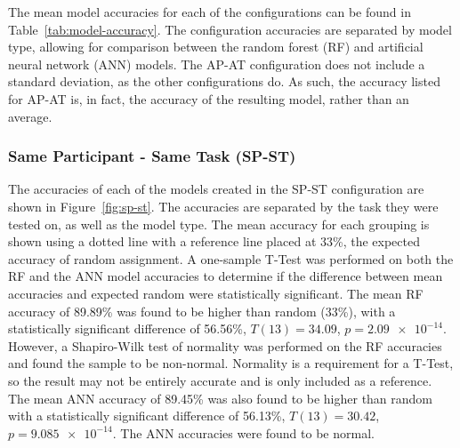 \documentclass[11pt]{article}
\begin{document}
	\begin{table}[]
		\caption[Model Accuracies]{Mean Model Accuracy of Random Forest(RF) and Neural Network(ANN)}
		\centering
		\label{tab:model-accuracy}
	\end{table}

	
	The mean model accuracies for each of the configurations can be found in Table~\ref{tab:model-accuracy}. The configuration accuracies are separated by model type, allowing for comparison between the random forest (RF) and artificial neural network (ANN) models. The AP-AT configuration does not include a standard deviation, as the other configurations do. As such, the accuracy listed for AP-AT is, in fact, the accuracy of the resulting model, rather than an average.
	
		\subsubsection{Same Participant - Same Task (SP-ST)}
		The accuracies of each of the models created in the SP-ST configuration are shown in Figure~\ref{fig:sp-st}. The accuracies are separated by the task they were tested on, as well as the model type. The mean accuracy for each grouping is shown using a dotted line with a reference line placed at 33\%, the expected accuracy of random assignment. A one-sample T-Test was performed on both the RF and the ANN model accuracies to determine if the difference between mean accuracies and expected random were statistically significant. The mean RF accuracy of 89.89\% was found to be higher than random (33\%), with a statistically significant difference of 56.56\%,  \(T(13) = 34.09\), \(p = \num{2.09e-14}\). However, a Shapiro-Wilk test of normality was performed on the RF accuracies and found the sample to be non-normal. Normality is a requirement for a T-Test, so the result may not be entirely accurate and is only included as a reference. The mean ANN accuracy of 89.45\% was also found to be higher than random with a statistically significant difference of 56.13\%, \(T(13) = 30.42\), \(p = \num{9.085e-14}\). The ANN accuracies were found to be normal.
		
\end{document}
